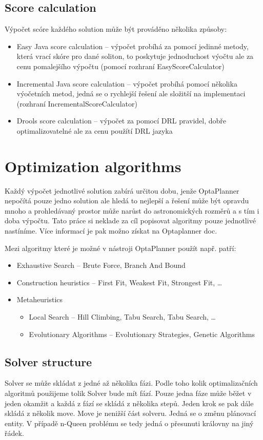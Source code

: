 \subsection{Score calculation}
Výpočet scóre každého solution může být prováděno několika způsoby: 
\begin{itemize}
\item Easy Java score calculation -- výpočet probíhá za pomocí jedinné metody, která vrací skóre pro dané soliton, to poskytuje jednoduchost výočtu ale za cenu pomalejšího výpočtu (pomocí rozhraní EasyScoreCalculator)
\item Incremental Java score calculation -- výpočet probíhá pomocí několika výočetních metod, jedná se o rychlejší řešení ale složitší na implementaci (rozhraní IncrementalScoreCalculator)
\item Drools score calculation -- výpočet za pomocí DRL pravidel, dobře optimalizovatelné ale za cenu použítí DRL jazyka
\end{itemize}

\section{Optimization algorithms}
Každý výpočet jednotlivé solution zabírá určitou dobu, jenže OptaPlanner nepočítá pouze jedno solution ale hledá to nejlepší a řešení může být opravdu mnoho a prohledávaný prostor může narůst do astronomických rozměrů a s tím i doba výpočtu. Tato práce si neklade za cíl popisovat algoritmy pouze jednotlivé nastíníme. Více informací je pak možno získat na Optaplanner doc.

Mezi algoritmy které je možné v nástroji OptaPlanner použít např. patří:
\begin{itemize}
\item Exhaustive Search -- Brute Force,  Branch And Bound
\item Construction heuristics --  First Fit, Weakest Fit,  Strongest Fit, \dots
\item Metaheuristics
\begin{itemize}
\item Local Search --  Hill Climbing, Tabu Search, Tabu Search, \dots
\item Evolutionary Algorithms -- Evolutionary Strategies, Genetic Algorithms
\end{itemize}
\end{itemize}
\subsection{Solver structure}
Solver se může skládat z jedné až několika fázi. Podle toho kolik optimalizačních algoritmů použijeme tolik Solver bude mít fází. Pouze jedna fáze může běžet v jeden okamžit a  každá z fází se skládá z několika stepů. Jeden krok se pak dále skládá z několik move. Move je nenižší část solveru. Jedná se o změnu plánovací entity. V případě n-Queen problému se tedy jedná o přesunuti královny na jiný řádek.  

